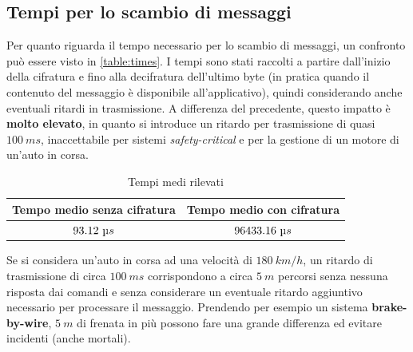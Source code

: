\subsection{Tempi per lo scambio di messaggi}
Per quanto riguarda il tempo necessario per lo scambio di messaggi, un confronto può essere visto in \autoref{table:times}. I tempi sono stati raccolti a partire dall'inizio della cifratura e fino alla decifratura dell'ultimo byte (in pratica quando il contenuto del messaggio è disponibile all'applicativo), quindi considerando anche eventuali ritardi in trasmissione. A differenza del precedente, questo impatto è \textbf{molto elevato}, in quanto si introduce un ritardo per trasmissione di quasi $100\ ms$, inaccettabile per sistemi \emph{safety-critical} e per la gestione di un motore di un'auto in corsa.

\begin{table}[h]
    \centering
    \begin{tabular}{| c | c |}
        \hline
        \large{\textbf{Tempo medio senza cifratura}} & \large{\textbf{Tempo medio con cifratura}} \\
        \hline
        $93.12\ \micro s$ & $96433.16\ \micro s$ \\
        \hline
    \end{tabular}
    \caption{Tempi medi rilevati}
    \label{table:times}
\end{table}

Se si considera un'auto in corsa ad una velocità di $180\ km/h$, un ritardo di trasmissione di circa $100\ ms$ corrispondono a circa $5\ m$ percorsi senza nessuna risposta dai comandi e senza considerare un eventuale ritardo aggiuntivo necessario per processare il messaggio. Prendendo per esempio un sistema \textbf{brake-by-wire}, $5\ m$ di frenata in più possono fare una grande differenza ed evitare incidenti (anche mortali).
\newpage
